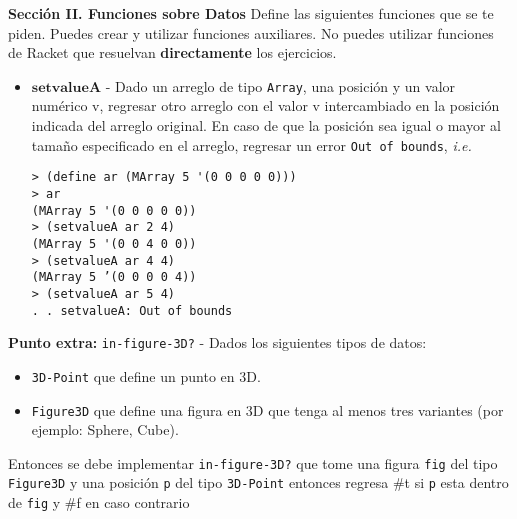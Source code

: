 \documentclass{article}
\begin{document}
\textbf{Sección II. Funciones sobre Datos} Define
las siguientes funciones que se te piden. Puedes crear y utilizar
funciones auxiliares. No puedes utilizar funciones de Racket que
resuelvan \textbf{directamente} los ejercicios.

\begin{itemize}
\item $\textbf{setvalueA}$ - Dado un arreglo de tipo \texttt{Array},
  una posición y un valor numérico v, regresar otro arreglo con el
  valor v intercambiado en la posición indicada del arreglo original.
  En caso de que la posición sea igual o mayor al tamaño especificado
  en el arreglo, regresar un error \texttt{Out of bounds},
  \textit{i.e.}
\begin{verbatim}
> (define ar (MArray 5 '(0 0 0 0 0)))
> ar
(MArray 5 '(0 0 0 0 0))
> (setvalueA ar 2 4)
(MArray 5 '(0 0 4 0 0))
> (setvalueA ar 4 4)
(MArray 5 ’(0 0 0 0 4))
> (setvalueA ar 5 4)
. . setvalueA: Out of bounds
\end{verbatim}

\end{itemize}

\textbf{Punto extra:} \texttt{in-figure-3D?} - Dados los siguientes tipos de datos:
\begin{itemize}
\item{ \texttt{3D-Point} que define un punto en 3D.}
\item{\texttt{Figure3D} que define una figura en 3D que tenga al menos tres variantes (por ejemplo: Sphere, Cube)}.
\end{itemize}
Entonces se debe implementar \texttt{in-figure-3D?} que tome una figura \texttt{fig} del tipo \texttt{Figure3D} y una posición \texttt{p} del tipo \texttt{3D-Point} entonces regresa \#t si \texttt{p} esta dentro de \texttt{fig} y \#f en caso contrario
\end{document}
